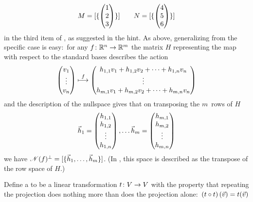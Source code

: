 \begin{exercises}
\begin{answer}
\begin{exparts}
           \begin{equation*}
             M=\relax [\mbox{$\{\begin{pmatrix} 1 \\ 2 \\ 3 \end{pmatrix}\}$}\relax ]
             \qquad
             N=\relax [\mbox{$\{\begin{pmatrix} 4 \\ 5 \\ 6 \end{pmatrix}\}$}\relax ]
           \end{equation*}
           in the third item of , as suggested
           in the hint.
        \partsitem As above, generalizing from the specific case is easy:~for 
           any $\mbox{$f\colon \mathbb{R}^n\to \mathbb{R}^m$}$
           the matrix $H$ representing the map with respect to the standard
           bases describes the action
           \begin{equation*}
             \begin{pmatrix} v_1 \\ \vdots \\ v_n \end{pmatrix}
             \stackrel{f}{\longmapsto}
             \begin{pmatrix} h_{1,1}v_1+h_{1,2}v_2+\dots+h_{1,n}v_n \\
                     \vdots                                 \\
                     h_{m,1}v_1+h_{m,2}v_2+\dots+h_{m,n}v_n \end{pmatrix}
           \end{equation*}
           and the description of the nullspace gives that
           on transposing the $m$~rows of $H$
           \begin{equation*}
             \vec{h}_1=\begin{pmatrix} h_{1,1} \\ h_{1,2} \\ \vdots \\ h_{1,n} \end{pmatrix},
              \dots
             \vec{h}_m=\begin{pmatrix} h_{m,1} \\ h_{m,2} \\ \vdots \\ h_{m,n} \end{pmatrix}
           \end{equation*}
           we have $\mathscr{N}(f)^\perp
                    =\relax [\mbox{$\{\vec{h}_1,\dots,\vec{h}_m\}$}\relax ]$.
           (In \cite{Strang93}, this space is described as the 
           transpose of the row space of $H$.)
      \end{exparts}
    \end{answer}
  \item
    Define a  
    to be a linear transformation
    \( \mbox{$t\colon V\to V$} \) with the property that 
    repeating the projection does nothing more than does the projection
    alone:~\( (t\mathbin\circ t)\,(\vec{v})=t(\vec{v}) \) 

\end{exercises}
